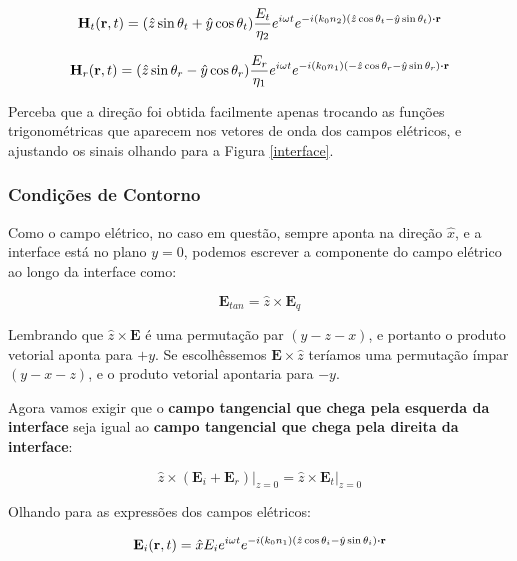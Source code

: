 \documentclass[12pt,a4paper]{report}
\begin{document}
\begin{equation*}
    \textbf{H}_t(\textbf{r},t)=(\hat{z}\sin\theta_t+\hat{y}\cos\theta_t)\frac{E_t}{\eta_2}e^{i\omega t}e^{-i(k_0n_2)(\hat{z}\cos\theta_t-\hat{y}\sin\theta_t)\vdot\textbf{r}}
\end{equation*}

\begin{equation*}
    \textbf{H}_r(\textbf{r},t)=
    (\hat{z}\sin\theta_r-\hat{y}\cos\theta_r)
    \frac{E_r}{\eta_1}
    e^{i\omega t}
        e^{
            -i(k_0n_1)(-\hat{z}\cos\theta_r-\hat{y}\sin\theta_r)
            \vdot
            \textbf{r}
          }
\end{equation*}

Perceba que a direção foi obtida facilmente apenas trocando as funções trigonométricas que aparecem nos vetores de onda dos campos elétricos, e ajustando os sinais olhando para a Figura \ref{interface}.

\subsubsection{Condições de Contorno}

Como o campo elétrico, no caso em questão, sempre aponta na direção $\hat{x}$, e a interface está no plano $y=0$, podemos escrever a componente do campo elétrico ao longo da interface como:

\begin{equation}
    \textbf{E}_{tan}=\hat{z} \times \textbf{E}_q
\end{equation}

Lembrando que $\hat{z}\times\textbf{E}$ é uma permutação par $(y-z-x)$, e portanto o produto vetorial aponta para $+y$. Se escolhêssemos $\textbf{E}\times \hat{z}$ teríamos uma permutação ímpar $(y-x-z)$, e o produto vetorial apontaria para $-y$.

Agora vamos exigir que o \textbf{campo tangencial que chega pela esquerda da interface} seja igual ao \textbf{campo tangencial que chega pela direita da interface}:

\begin{equation}
    \hat{z}\times(\textbf{E}_i+\textbf{E}_r)\bigr|_{z=0}=\hat{z}\times\textbf{E}_t\bigr|_{z=0}
\end{equation}

Olhando para as expressões dos campos elétricos:

\begin{equation*}
    \textbf{E}_i(\textbf{r},t)=\hat{x}E_ie^{i\omega t}e^{-i(k_0n_1)(\hat{z}\cos\theta_i-\hat{y}\sin\theta_i)\vdot\textbf{r}}
\end{equation*}
\end{document}
